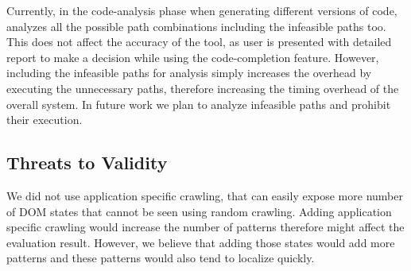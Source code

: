 			
	Currently, in the code-analysis phase when generating different versions of code, \dompletion analyzes all the possible path combinations including the infeasible paths too. This does not affect the accuracy of the tool, as user is presented with detailed report to make a decision while using the code-completion feature. However, including the infeasible paths for analysis simply increases the overhead by executing the unnecessary paths, therefore increasing the timing overhead of the overall system. In future work we plan to analyze infeasible paths and prohibit their execution.
	
	
	
	
	\subsection{Threats to Validity}
	\label{Sec:Threats}
	
	We did not use application specific crawling, that can easily expose more number of DOM states that cannot be seen using random crawling. Adding application specific crawling would increase the number of \css patterns therefore might affect the evaluation result. However, we believe that adding those states would add more \css patterns and these \css patterns would also tend to localize quickly.